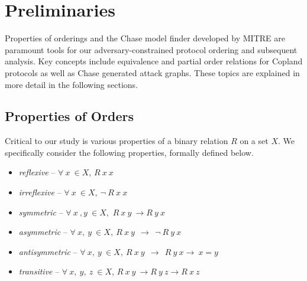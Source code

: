 \documentclass[runningheads]{llncs}
\theoremstyle{definition}
\newcommand{\squash}{\itemsep=0pt\parskip=0pt}
\begin{document}


\section{Preliminaries}

Properties of orderings and the Chase model finder developed by MITRE \cite{Ramsdell:2020:Chase} are paramount tools for our adversary-constrained protocol ordering and subsequent analysis. Key concepts include equivalence and partial order relations for Copland protocols as well as Chase generated attack graphs. These topics are explained in more detail in the following sections.

\subsection*{Properties of Orders}

Critical to our study is various properties of a binary relation $R$ on a set $X$. We specifically consider the following properties, formally defined below.

\begin{itemize}
    \squash
    \item \emph{reflexive} -- $ \forall\: x\: \in X$, $R\: x\: x$
    \item \emph{irreflexive} -- $ \forall \: x\: \in X, \: \neg \: R\: x\: x$
    \item \emph{symmetric} -- $ \forall\: x\: , y\: \in X,$ $R\: x\: y\:\rightarrow R\: y\: x$
    \item \emph{asymmetric} --  $\forall\: x,\: y\:\in X,\: R\: x\: y\:\: \rightarrow  \:\: \neg \:R\: y\: x $  
    \item \emph{antisymmetric} --  $\forall\: x,\: y\:\in X,\: R\: x\: y\:\: \rightarrow \:\: R\: y\: x \rightarrow \:x = y$ 
    \item \emph{transitive} -- $ \forall\: x,\: y,\: z\:\in X$, $R\: x\: y\: \rightarrow R\: y\: z \rightarrow R\: x\: z$
\end{itemize}
\end{document}
